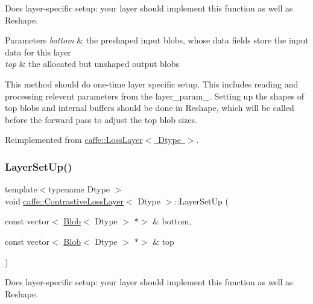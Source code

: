 Does layer-\/specific setup\+: your layer should implement this function as well as Reshape. 


\begin{DoxyParams}{Parameters}
{\em bottom} & the preshaped input blobs, whose data fields store the input data for this layer \\
\hline
{\em top} & the allocated but unshaped output blobs\\
\hline
\end{DoxyParams}
This method should do one-\/time layer specific setup. This includes reading and processing relevent parameters from the {\ttfamily layer\+\_\+param\+\_\+}. Setting up the shapes of top blobs and internal buffers should be done in {\ttfamily Reshape}, which will be called before the forward pass to adjust the top blob sizes. 

Reimplemented from \mbox{\hyperlink{classcaffe_1_1_loss_layer_aa6fc7c2e90be66f1c1f0683637c949da}{caffe\+::\+Loss\+Layer$<$ Dtype $>$}}.

\mbox{\label{classcaffe_1_1_contrastive_loss_layer_a943e67e7bb9c2362ec20ce44c777beac}} 
\subsubsection{\texorpdfstring{Layer\+Set\+Up()}{LayerSetUp()}\hspace{0.1cm}{\footnotesize\ttfamily [2/2]}}
{\footnotesize\ttfamily template$<$typename Dtype $>$ \\
void \mbox{\hyperlink{classcaffe_1_1_contrastive_loss_layer}{caffe\+::\+Contrastive\+Loss\+Layer}}$<$ Dtype $>$\+::Layer\+Set\+Up (\begin{DoxyParamCaption}\item[{const vector$<$ \mbox{\hyperlink{classcaffe_1_1_blob}{Blob}}$<$ Dtype $>$ $\ast$$>$ \&}]{bottom,  }\item[{const vector$<$ \mbox{\hyperlink{classcaffe_1_1_blob}{Blob}}$<$ Dtype $>$ $\ast$$>$ \&}]{top }\end{DoxyParamCaption})\hspace{0.3cm}{\ttfamily [virtual]}}



Does layer-\/specific setup\+: your layer should implement this function as well as Reshape. 


